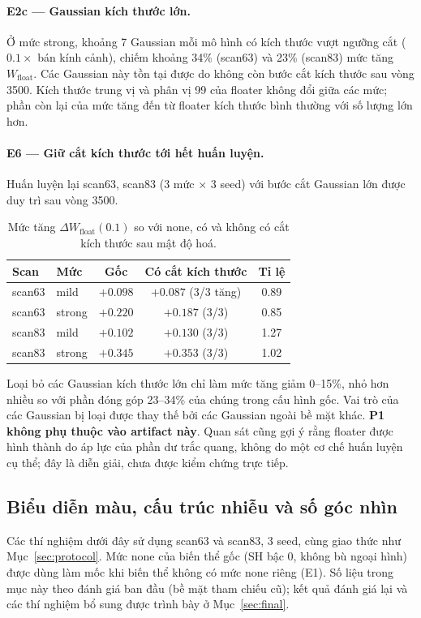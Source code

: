\documentclass[11pt,a4paper]{article}
\begin{document}
\paragraph{E2c --- Gaussian kích thước lớn.} Ở mức strong, khoảng 7 Gaussian mỗi mô hình có kích thước vượt ngưỡng cắt ($0.1\times$ bán kính cảnh), chiếm khoảng 34\% (scan63) và 23\% (scan83) mức tăng $W_{\text{float}}$. Các Gaussian này tồn tại được do không còn bước cắt kích thước sau vòng 3500. Kích thước trung vị và phân vị 99 của floater không đổi giữa các mức; phần còn lại của mức tăng đến từ floater kích thước bình thường với số lượng lớn hơn.

\paragraph{E6 --- Giữ cắt kích thước tới hết huấn luyện.} Huấn luyện lại scan63, scan83 (3 mức $\times$ 3 seed) với bước cắt Gaussian lớn được duy trì sau vòng 3500.
\begin{table}[H]
\centering\small
\caption{Mức tăng $\Delta W_{\text{float}}(0.1)$ so với none, có và không có cắt kích thước sau mật độ hoá.}
\begin{tabular}{@{}llccc@{}}
\toprule
Scan & Mức & Gốc & Có cắt kích thước & Tỉ lệ \\
\midrule
scan63 & mild & $+0.098$ & $+0.087$ (3/3 tăng) & 0.89 \\
scan63 & strong & $+0.220$ & $+0.187$ (3/3) & 0.85 \\
scan83 & mild & $+0.102$ & $+0.130$ (3/3) & 1.27 \\
scan83 & strong & $+0.345$ & $+0.353$ (3/3) & 1.02 \\
\bottomrule
\end{tabular}
\end{table}
Loại bỏ các Gaussian kích thước lớn chỉ làm mức tăng giảm 0--15\%, nhỏ hơn nhiều so với phần đóng góp 23--34\% của chúng trong cấu hình gốc. Vai trò của các Gaussian bị loại được thay thế bởi các Gaussian ngoài bề mặt khác. \textbf{P1 không phụ thuộc vào artifact này}. Quan sát cũng gợi ý rằng floater được hình thành do áp lực của phần dư trắc quang, không do một cơ chế huấn luyện cụ thể; đây là diễn giải, chưa được kiểm chứng trực tiếp.

\subsection{Biểu diễn màu, cấu trúc nhiễu và số góc nhìn}
\label{sec:factors}
Các thí nghiệm dưới đây sử dụng scan63 và scan83, 3 seed, cùng giao thức như Mục~\ref{sec:protocol}. Mức none của biến thể gốc (SH bậc 0, không bù ngoại hình) được dùng làm mốc khi biến thể không có mức none riêng (E1). Số liệu trong mục này theo đánh giá ban đầu (bề mặt tham chiếu cũ); kết quả đánh giá lại và các thí nghiệm bổ sung được trình bày ở Mục~\ref{sec:final}.
\end{document}
